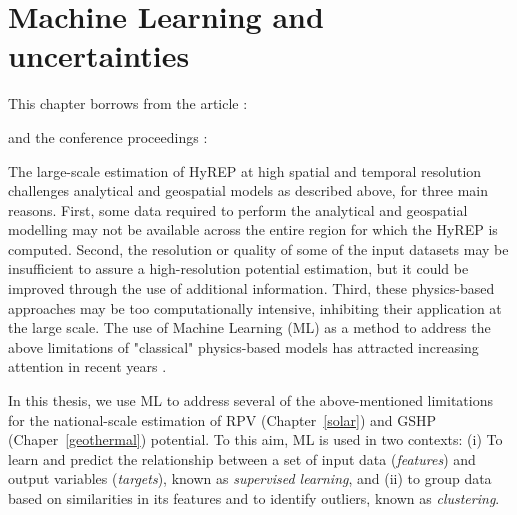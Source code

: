 \chapter{Machine Learning and uncertainties}
\label{methods_ML}

\vspace{-15pt} %
\begin{tcolorbox}[enhanced,width=\textwidth,size=fbox,
        sharp corners,colframe=black!5!white,drop fuzzy shadow southeast,
        boxrule=3mm, parbox=false] 
        
This chapter borrows from the article \citep{walch_big_2020}:

\qquad {}

and the conference proceedings \cite{walch_spatio-temporal_2019, walch_fast_2019-1}:

\quad {} 

\quad {}
\end{tcolorbox}

The large-scale estimation of HyREP at high spatial and temporal resolution challenges analytical and geospatial models as described above, for three main reasons.
First, some data required to perform the analytical and geospatial modelling may not be available across the entire region for which the HyREP is computed.
Second, the resolution or quality of some of the input datasets may be insufficient to assure a high-resolution potential estimation, but it could be improved through the use of additional information.
Third, these physics-based approaches may be too computationally intensive, inhibiting their application at the large scale.
The use of Machine Learning (ML) as a method to address the above limitations of "classical" physics-based models has attracted increasing attention in recent years \cite{willard_integrating_2020}. 

In this thesis, we use ML to address several of the above-mentioned limitations for the national-scale estimation of RPV (Chapter~\ref{solar}) and GSHP (Chaper~\ref{geothermal}) potential. 
To this aim, ML is used in two contexts: 
(i) To learn and predict the relationship between a set of input data (\textit{features}) and output variables (\textit{targets}), known as \textit{supervised learning}, 
and (ii) to group data based on similarities in its features and to identify outliers, known as \textit{clustering}. 

